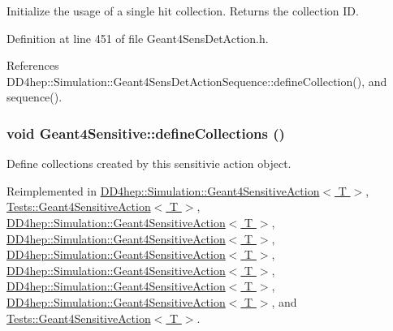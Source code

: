Initialize the usage of a single hit collection. Returns the collection ID. 

Definition at line 451 of file Geant4SensDetAction.h.

References DD4hep::Simulation::Geant4SensDetActionSequence::defineCollection(), and sequence().\hypertarget{class_d_d4hep_1_1_simulation_1_1_geant4_sensitive_a88c872b79e49e399c8ee282960c2d77d}{
\subsubsection[{defineCollections}]{\setlength{\rightskip}{0pt plus 5cm}void Geant4Sensitive::defineCollections ()}}
\label{class_d_d4hep_1_1_simulation_1_1_geant4_sensitive_a88c872b79e49e399c8ee282960c2d77d}


Define collections created by this sensitivie action object. 

Reimplemented in \hyperlink{class_d_d4hep_1_1_simulation_1_1_geant4_sensitive_action_a103768b61e0f22768de9a91ce588a88c}{DD4hep::Simulation::Geant4SensitiveAction$<$ T $>$}, \hyperlink{class_tests_1_1_geant4_sensitive_action_a0083f23f8b2160bc6e03ccd11077182c}{Tests::Geant4SensitiveAction$<$ T $>$}, \hyperlink{class_d_d4hep_1_1_simulation_1_1_geant4_sensitive_action_a414ca0e288f6b1a298bebda417f5be18}{DD4hep::Simulation::Geant4SensitiveAction$<$ T $>$}, \hyperlink{class_d_d4hep_1_1_simulation_1_1_geant4_sensitive_action_a4c99ecfb911ff6828db0c98b331e2ca5}{DD4hep::Simulation::Geant4SensitiveAction$<$ T $>$}, \hyperlink{class_d_d4hep_1_1_simulation_1_1_geant4_sensitive_action_a6fec266f731814c2fb5aa21646032690}{DD4hep::Simulation::Geant4SensitiveAction$<$ T $>$}, \hyperlink{class_d_d4hep_1_1_simulation_1_1_geant4_sensitive_action_a76b62dc60cda1378d90d578c247705d8}{DD4hep::Simulation::Geant4SensitiveAction$<$ T $>$}, \hyperlink{class_d_d4hep_1_1_simulation_1_1_geant4_sensitive_action_a827b5e46eae9a7b69e91d6f0ee58733d}{DD4hep::Simulation::Geant4SensitiveAction$<$ T $>$}, \hyperlink{class_d_d4hep_1_1_simulation_1_1_geant4_sensitive_action_a0d2c4744420ef0f886d26e424d2357ba}{DD4hep::Simulation::Geant4SensitiveAction$<$ T $>$}, and \hyperlink{class_tests_1_1_geant4_sensitive_action_a1b06a4ee804c34ed5a77145c4b2ec736}{Tests::Geant4SensitiveAction$<$ T $>$}.

